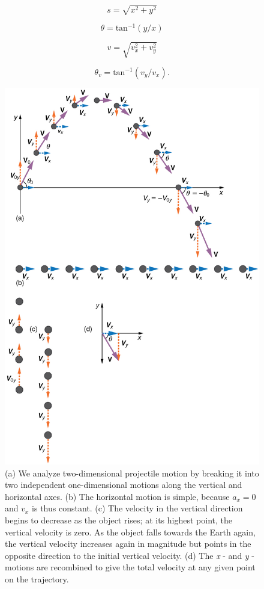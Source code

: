 \documentclass[
]{book}
\begin{document}
\leavevmode\hypertarget{eip-743}{}%
\[{s = \sqrt{x^{2} + y^{2}}}{}\]

\leavevmode\hypertarget{eip-373}{}%
\[{{\theta = \text{tan}^{- 1}}({y/x})}{}\]

\leavevmode\hypertarget{eip-679}{}%
\[{v = \sqrt{v_{x}^{2} + v_{y}^{2}}}{}\]

\leavevmode\hypertarget{eip-264}{}%
\[{{\theta_{v} = \text{tan}^{- 1}}({v_{y}/v_{x}})\text{.}}{}\]

\begin{figure}
\hypertarget{import-auto-id1815222}{%
\centering
\includegraphics{images/Figure_03_04_02.jpg}
\caption{(a) We analyze two-dimensional projectile motion by breaking it into
two independent one-dimensional motions along the vertical and
horizontal axes. (b) The horizontal motion is simple, because
\({a_{x} = 0}{}\) and \(v_{x}{}\) is thus constant. (c) The velocity in the
vertical direction begins to decrease as the object rises; at its
highest point, the vertical velocity is zero. As the object falls
towards the Earth again, the vertical velocity increases again in
magnitude but points in the opposite direction to the initial vertical
velocity. (d) The \emph{x} - and \emph{y} -motions are recombined to give the
total velocity at any given point on the
trajectory.}\label{import-auto-id1815222}
}
\end{figure}
\end{document}
